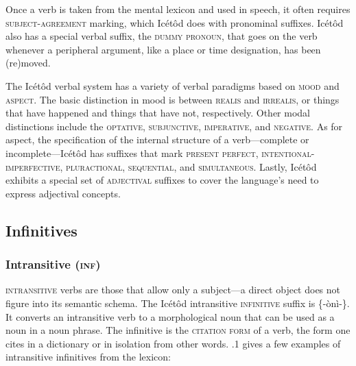 Once a verb is taken from the mental lexicon and used in speech, it often requires \textsc{subject-agreement} marking, which Icétôd does with pronominal suffixes. Icétôd also has a special verbal suffix, the \textsc{dummy} \textsc{pronoun}, that goes on the verb whenever a peripheral argument, like a place or time designation, has been (re)moved.

The Icétôd verbal system has a variety of verbal paradigms based on \textsc{mood} and \textsc{aspect}. The basic distinction in mood is between \textsc{realis} and \textsc{irrealis}, or things that have happened and things that have not, respectively. Other modal distinctions include the \textsc{optative}, \textsc{subjunctive}, \textsc{imperative}, and \textsc{negative}. As for aspect, the specification of the internal structure of a verb—complete or incomplete—Icétôd has suffixes that mark \textsc{present perfect}, \textsc{intentional}{}-\textsc{imperfective}, \textsc{pluractional}, \textsc{sequential}, and \textsc{simultaneous}. Lastly, Icétôd exhibits a special set of \textsc{adjectival} suffixes to cover the language’s need to express adjectival concepts.




\subsection{Infinitives}
\subsubsection{Intransitive (\textsc{inf})}

\textsc{intransitive} verbs are those that allow only a subject—a direct object does not figure into its semantic schema. The Icétôd intransitive \textsc{infinitive} suffix is \{-ònì-\}. It converts an intransitive verb to a morphological noun that can be used as a noun in a noun phrase. The infinitive is the \textsc{citation} \textsc{form} of a verb, the form one cites in a dictionary or in isolation from other words. .1 gives a few examples of intransitive infinitives from the lexicon:


